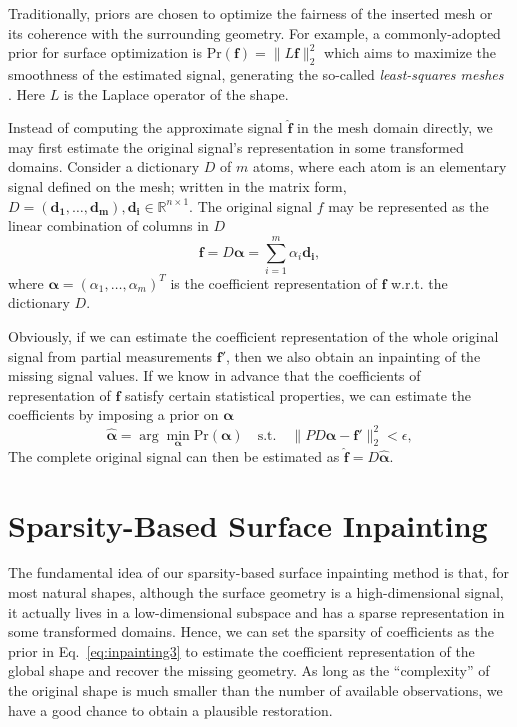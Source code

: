 Traditionally, priors are chosen to optimize the fairness of the
inserted mesh or its coherence with the surrounding geometry. For
example, a commonly-adopted prior for surface optimization is
$\text{Pr}(\mathbf{f})=\|L\mathbf{f}\|_2^2$ which aims to maximize the
smoothness of the estimated signal, generating the so-called
\emph{least-squares meshes} \cite{Sorkine2004}. Here $L$ is the
Laplace operator of the shape.

Instead of computing the approximate signal $\hat{\mathbf{f}}$ in the
mesh domain directly, we may first estimate the original signal's
representation in some transformed domains. Consider a dictionary $D$
of $m$ atoms, where each atom is an elementary signal defined on the
mesh; written in the matrix form,
$D=(\mathbf{d_1},\ldots,\mathbf{d_m}), \mathbf{d_i}\in
\mathbb{R}^{n\times 1}$. The original signal $f$ may be represented as
the linear combination of columns in $D$
\begin{equation}
\mathbf{f} = D\mathbf{\alpha} = \sum_{i=1}^{m}\alpha_i\mathbf{d_i},
\end{equation}
where $\mathbf{\alpha} = (\alpha_1,\ldots,\alpha_m)^T$ is the
coefficient representation of $\mathbf{f}$ w.r.t. the dictionary $D$.

Obviously, if we can estimate the coefficient representation of the
whole original signal from partial measurements $\mathbf{f}'$, then we
also obtain an inpainting of the missing signal values. If we know in
advance that the coefficients of representation of $\mathbf{f}$
satisfy certain statistical properties, we can estimate the
coefficients by imposing a prior on $\mathbf{\alpha}$
\begin{equation}
\label{eq:inpainting3}
\hat{\mathbf{\alpha}} = \arg\min_{\mathbf{\alpha}} \text{Pr}(\mathbf{\alpha}) \quad \text{s.t.} \quad \|PD\mathbf{\alpha} - \mathbf{f'}\|_2^2 < \epsilon,
\end{equation}
The complete original signal can then be estimated as
$\hat{\mathbf{f}}=D\mathbf{\hat{\alpha}}$.


\section{Sparsity-Based Surface Inpainting}

The fundamental idea of our sparsity-based surface inpainting method is that,
for most natural shapes, although the surface geometry is a high-dimensional
signal, it actually lives in a low-dimensional subspace and has a sparse
representation in some transformed domains. Hence, we can set the sparsity of
coefficients as the prior in Eq.~\ref{eq:inpainting3} to estimate the
coefficient representation of the global shape and recover the missing
geometry. As long as the ``complexity'' of the original shape is much smaller
than the number of available observations, we have a good chance to obtain a
plausible restoration.


